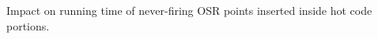 \label{fig:code-quality} Impact on running time of never-firing OSR points inserted inside hot code portions.
  
  
  